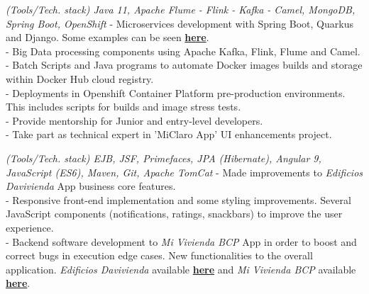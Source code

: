 \documentclass[]{CV-JuanCamiloFlorez}
\begin{document}
\begin{minipage}[t]{0.66\textwidth}
    \textit{(Tools/Tech. stack) Java 11, Apache Flume - Flink - Kafka - Camel, MongoDB, Spring Boot, OpenShift}
        - Microservices development with Spring Boot, Quarkus and Django. Some examples can be seen \textbf{\href{https://github.com/VanJFlorez/flink-kafka-fraud-detection}{here}}. \\
        - Big Data processing components using Apache Kafka, Flink, Flume and Camel. \\
        - Batch Scripts and Java programs to automate Docker images builds and storage within Docker Hub cloud registry. \\
        - Deployments in Openshift Container Platform pre-production environments. This includes scripts for builds and image stress tests. \\
        - Provide mentorship for Junior and entry-level developers. \\
        - Take part as technical expert in 'MiClaro App' UI enhancements project. \\
        \sectionsep

    \textit{(Tools/Tech. stack) EJB, JSF, Primefaces, JPA (Hibernate), Angular 9, JavaScript (ES6), Maven, Git, Apache TomCat}
        - Made improvements to \textit{Edificios Davivienda} App business core features. \\
        - Responsive front-end implementation and some styling improvements. Several JavaScript components (notifications, ratings, snackbars) to improve the user experience. \\
        - Backend software development to \textit{Mi Vivienda BCP} App in order to boost and correct bugs in execution edge cases. New functionalities to the overall application. \textit{Edificios Davivienda} available \textbf{\href{https://www.edificiosdavivienda.com}{here}} and \textit{Mi Vivienda BCP} available \textbf{\href{https://www.miviviendabcp.com.bo}{here}}. \\
        \sectionsep


\end{minipage}
\end{document}
